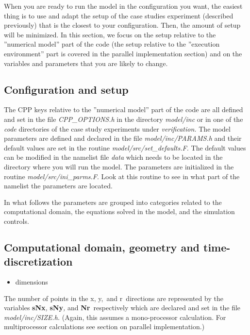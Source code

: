 When you are ready to run the model in the configuration you want, the
easiest thing is to use and adapt the setup of the case studies experiment
(described previously) that is the closest to your configuration. Then, the
amount of setup will be minimized. In this section, we focus on the setup
relative to the ''numerical model'' part of the code (the setup relative to
the ''execution environment'' part is covered in the parallel implementation
section) and on the variables and parameters that you are likely to change.

\subsection{Configuration and setup}

The CPP keys relative to the ''numerical model'' part of the code are all
defined and set in the file \textit{CPP\_OPTIONS.h }in the directory \textit{%
model/inc }or in one of the \textit{code }directories of the case study
experiments under \textit{verification.} The model parameters are defined
and declared in the file \textit{model/inc/PARAMS.h }and their default
values are set in the routine \textit{model/src/set\_defaults.F. }The
default values can be modified in the namelist file \textit{data }which
needs to be located in the directory where you will run the model. The
parameters are initialized in the routine \textit{model/src/ini\_parms.F}.
Look at this routine to see in what part of the namelist the parameters are
located.

In what follows the parameters are grouped into categories related to the
computational domain, the equations solved in the model, and the simulation
controls.

\subsection{Computational domain, geometry and time-discretization}

\begin{itemize}
\item dimensions
\end{itemize}

The number of points in the x, y,\textit{\ }and r\textit{\ }directions are
represented by the variables \textbf{sNx}\textit{, }\textbf{sNy}\textit{, }%
and \textbf{Nr}\textit{\ }respectively which are declared and set in the
file \textit{model/inc/SIZE.h. }(Again, this assumes a mono-processor
calculation. For multiprocessor calculations see section on parallel
implementation.)

